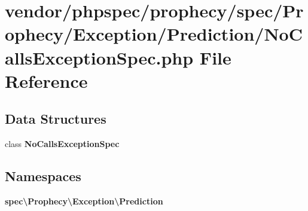 \section{vendor/phpspec/prophecy/spec/\+Prophecy/\+Exception/\+Prediction/\+No\+Calls\+Exception\+Spec.php File Reference}
\label{_no_calls_exception_spec_8php}
\subsection*{Data Structures}
\begin{DoxyCompactItemize}
\item 
class {\bf No\+Calls\+Exception\+Spec}
\end{DoxyCompactItemize}
\subsection*{Namespaces}
\begin{DoxyCompactItemize}
\item 
 {\bf spec\textbackslash{}\+Prophecy\textbackslash{}\+Exception\textbackslash{}\+Prediction}
\end{DoxyCompactItemize}

